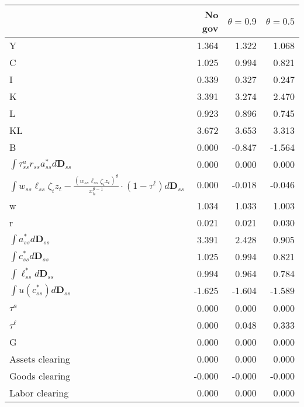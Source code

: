 \begin{tabular}{lrrr}
\toprule
 & No gov & $\theta=0.9$ & $\theta=0.5$ \\
\midrule
Y & 1.364 & 1.322 & 1.068 \\
C & 1.025 & 0.994 & 0.821 \\
I & 0.339 & 0.327 & 0.247 \\
K & 3.391 & 3.274 & 2.470 \\
L & 0.923 & 0.896 & 0.745 \\
KL & 3.672 & 3.653 & 3.313 \\
B & 0.000 & -0.847 & -1.564 \\
$\int \tau^{a}_{ss}r_{ss}a^{*}_{ss}d\mathbf{D}_{ss}$ & 0.000 & 0.000 & 0.000 \\
$\int w_{ss}\ell_{ss} \zeta_{i}z_{t} - \frac{\left(w_{ss}\ell_{ss} \zeta_{i}z_{t}\right)^{\theta}}{ x_{h}^{\theta-1}} \cdot \left(1-\tau^{\ell} \right) d\boldsymbol{D}_{ss}$ & 0.000 & -0.018 & -0.046 \\
w & 1.034 & 1.033 & 1.003 \\
r & 0.021 & 0.021 & 0.030 \\
$\int a^{*}_{ss} d\mathbf{D}_{ss}$ & 3.391 & 2.428 & 0.905 \\
$\int c^{*}_{ss} d\mathbf{D}_{ss}$ & 1.025 & 0.994 & 0.821 \\
$\int \ell^{*}_{ss} d\mathbf{D}_{ss}$ & 0.994 & 0.964 & 0.784 \\
$\int u \left(c^{*}_{ss} \right) d\mathbf{D}_{ss}$ & -1.625 & -1.604 & -1.589 \\
$\tau^{a}$ & 0.000 & 0.000 & 0.000 \\
$\tau^{\ell}$ & 0.000 & 0.048 & 0.333 \\
G & 0.000 & 0.000 & 0.000 \\
Assets clearing & 0.000 & 0.000 & 0.000 \\
Goods clearing & -0.000 & -0.000 & -0.000 \\
Labor clearing & 0.000 & 0.000 & 0.000 \\
\bottomrule
\end{tabular}
